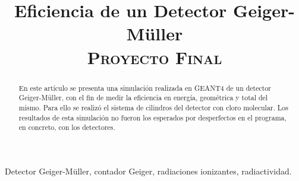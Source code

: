 \documentclass[conference]{IEEEtran}
\begin{document}
\title{Eficiencia de un Detector Geiger-Müller \\
{\footnotesize \scshape{Proyecto Final}}
}

\author{
}



\maketitle

\begin{abstract}
	En este artículo se presenta una simulación realizada en GEANT4 de un detector Geiger-Müller, con el fin de medir la eficiencia en energía, geométrica y total del mismo. Para ello se realizó el sistema de cilindros del detector con cloro molecular. Los resultados de esta simulación no fueron los esperados por desperfectos en el programa, en concreto, con los detectores.
\end{abstract}

\begin{IEEEkeywords}
	Detector Geiger-Müller, contador Geiger, radiaciones ionizantes, radiactividad.
\end{IEEEkeywords}
\end{document}

